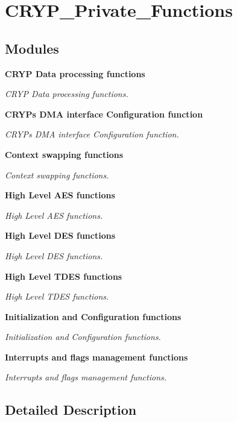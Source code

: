 \section{C\+R\+Y\+P\+\_\+\+Private\+\_\+\+Functions}
\label{group__CRYP__Private__Functions}
\subsection*{Modules}
\begin{DoxyCompactItemize}
\item 
\textbf{ C\+R\+Y\+P Data processing functions}
\begin{DoxyCompactList}\small\item\em C\+R\+YP Data processing functions. \end{DoxyCompactList}\item 
\textbf{ C\+R\+Y\+P\textquotesingle{}s D\+M\+A interface Configuration function}
\begin{DoxyCompactList}\small\item\em C\+R\+YP\textquotesingle{}s D\+MA interface Configuration function. \end{DoxyCompactList}\item 
\textbf{ Context swapping functions}
\begin{DoxyCompactList}\small\item\em Context swapping functions. \end{DoxyCompactList}\item 
\textbf{ High Level A\+E\+S functions}
\begin{DoxyCompactList}\small\item\em High Level A\+ES functions. \end{DoxyCompactList}\item 
\textbf{ High Level D\+E\+S functions}
\begin{DoxyCompactList}\small\item\em High Level D\+ES functions. \end{DoxyCompactList}\item 
\textbf{ High Level T\+D\+E\+S functions}
\begin{DoxyCompactList}\small\item\em High Level T\+D\+ES functions. \end{DoxyCompactList}\item 
\textbf{ Initialization and Configuration functions}
\begin{DoxyCompactList}\small\item\em Initialization and Configuration functions. \end{DoxyCompactList}\item 
\textbf{ Interrupts and flags management functions}
\begin{DoxyCompactList}\small\item\em Interrupts and flags management functions. \end{DoxyCompactList}\end{DoxyCompactItemize}


\subsection{Detailed Description}
